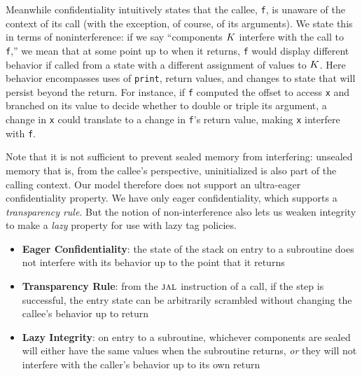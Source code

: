 Meanwhile confidentiality intuitively states that the callee, {\tt f}, is unaware
of the context of its call (with the exception, of course, of its arguments).
We state this in terms of noninterference: if we say ``components \(K\)
interfere with the call to {\tt f},'' we mean that at some point up to when it returns,
{\tt f} would display different behavior if called from a state with a different
assignment of values to \(K\). Here behavior encompasses uses of {\tt print},
return values, and changes to state that will persist beyond the return.
For instance, if {\tt f} computed the offset to access {\tt x} and branched on its value
to decide whether to double or triple its argument, a change in {\tt x} could translate
to a change in {\tt f}'s return value, making {\tt x} interfere with {\tt f}.

Note that it is not sufficient to prevent sealed memory from interfering: unsealed
memory that is, from the callee's perspective, uninitialized is also part of the calling
context. Our model therefore does not support an ultra-eager confidentiality property.
We have only eager confidentiality, which supports a {\em transparency rule}. But the
notion of non-interference also lets us weaken integrity to make a {\em lazy} property
for use with lazy tag policies.

\begin{itemize}
\item {\bf Eager Confidentiality}: the state of the stack on entry to a subroutine
  does not interfere with its behavior up to the point that it returns
\item {\bf Transparency Rule}: from the \(\textsc{jal}\) instruction of a call, if the step is
  successful, the entry state can be arbitrarily scrambled without changing the callee's
  behavior up to return
\item {\bf Lazy Integrity}:  on entry to a subroutine, whichever components are
  sealed will either have the same values when the subroutine returns, {\em or} they will
  not interfere with the caller's behavior up to its own return
\end{itemize}
